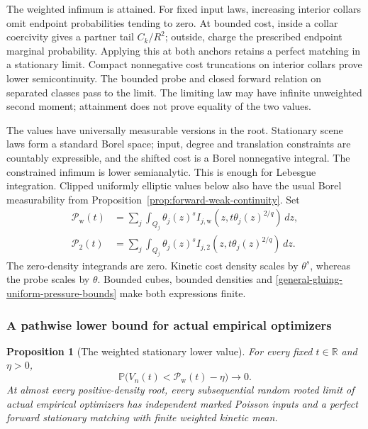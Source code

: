 \documentclass[11pt,reqno]{amsart}
\newtheorem{proposition}[theorem]{Proposition}
\theoremstyle{definition}
\theoremstyle{remark}
\numberwithin{equation}{section}
\newcommand{\R}{\mathbb R}
\newcommand{\Pp}{\mathbb P}
\begin{document}
The weighted infimum is attained. For fixed input laws, increasing interior
collars omit endpoint probabilities tending to zero. At bounded cost,
inside a collar coercivity gives a partner tail \(C_k/R^2\); outside,
charge the prescribed endpoint marginal probability. Applying this at both
anchors retains a perfect matching in a stationary limit. Compact
nonnegative cost truncations on interior collars prove lower
semicontinuity. The bounded probe and closed forward relation on separated
classes pass to the limit. The limiting law may have infinite unweighted
second moment; attainment does not prove equality of the two values.

The values have universally measurable versions in the root. Stationary
scene laws form a standard Borel space; input, degree and translation
constraints are countably expressible, and the shifted cost is a Borel
nonnegative integral. The constrained infimum is lower semianalytic.
This is enough for Lebesgue integration. Clipped uniformly elliptic values
below also have the usual Borel measurability from
Proposition~\ref{prop:forward-weak-continuity}. Set
\begin{equation}
\label{general-gluing-integrated-pressures}
 \begin{split}
 \mathcal P_{\mathrm w}(t)
   &=\sum_j\int_{Q_j}\theta_j(z)^s
       I_{j,\mathrm w}(z,t\theta_j(z)^{2/q})\,dz,\\
 \mathcal P_2(t)
   &=\sum_j\int_{Q_j}\theta_j(z)^s
       I_{j,2}(z,t\theta_j(z)^{2/q})\,dz.
 \end{split}
\end{equation}
The zero-density integrands are zero. Kinetic cost density scales by
\(\theta^s\), whereas the probe scales by \(\theta\). Bounded cubes,
bounded densities and \eqref{general-gluing-uniform-pressure-bounds} make
both expressions finite.

\subsubsection{A pathwise lower bound for actual empirical optimizers}

\begin{proposition}[The weighted stationary lower value]
\label{general-gluing-weighted-lower}
For every fixed \(t\in\R\) and \(\eta>0\),
\begin{equation}
\label{general-gluing-probability-lower}
 \Pp\bigl(V_n(t)<\mathcal P_{\mathrm w}(t)-\eta\bigr)
                  \longrightarrow0.
\end{equation}
At almost every positive-density root, every subsequential random rooted
limit of actual empirical optimizers has independent marked Poisson inputs
and a perfect forward stationary matching with finite weighted kinetic mean.
\end{proposition}
\end{document}

